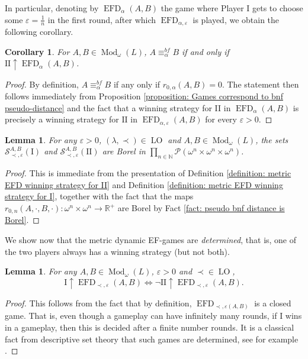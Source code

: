 \documentclass[12pt]{amsart}
\newtheorem{corollary}[theorem]{Corollary}
\newtheorem{lemma}[theorem]{Lemma}
\DeclareMathOperator{\EFD}{EFD}
\DeclareMathOperator{\Mod}{Mod}
\DeclareMathOperator{\LO}{LO}
\begin{document}
In particular, denoting by $\EFD_\alpha(A,B)$ the game where Player I gets to choose some $\varepsilon=\frac{1}{n}$ in the first round, after which $\EFD_{\alpha,\varepsilon}$ is played, we obtain the following corollary.

\begin{corollary}
    For $A,B\in\Mod_\omega(L)$, $A\equiv_\alpha^{bf} B$ if and only if $\mathrm{II}\uparrow \EFD_\alpha(A,B)$.
\end{corollary}
\begin{proof}
    By definition, $A\equiv_\alpha^{bf} B$ if any only if $r_{0,\alpha}(A,B)=0$. The statement then follows immediately from Proposition \ref{proposition: Games correspond to bnf pseudo-distance} and the fact that a winning strategy for II in $\EFD_\alpha(A,B)$ is precisely a winning strategy for $\mathrm{II}$ in $\EFD_{\alpha,\varepsilon}(A,B)$ for every $\varepsilon>0$.
\end{proof}

\begin{lemma}\label{lemma: set of winning strategies is Borel}
    For any $\varepsilon>0$, $(\lambda,\prec)\in\LO$ and $A,B\in\Mod_\omega(L)$, the sets $\mathcal{S}_{\prec,\varepsilon}^{A,B}(\mathrm{I})$ and $\mathcal{S}_{\prec,\varepsilon}^{A,B}(\mathrm{II})$ are Borel in $\prod_{n\in\mathbb N}\mathcal{P}(\omega^n\times\omega^n\times\omega^n)$.
\end{lemma}
\begin{proof}
    This is immediate from the presentation of Definition \ref{definition: metric EFD winning strategy for II} and Definition \ref{definition: metric EFD winning strategy for I}, together with the fact that the maps $r_{0,n}(A,\cdot,B,\cdot) \colon \omega^n\times\omega^n\to\mathbb R^+$ are Borel by Fact \ref{fact: pseudo bnf distance is Borel}.
\end{proof}

We show now that the metric dynamic EF-games are \textit{determined}, that is, one of the two players always has a winning strategy (but not both).

\begin{lemma}\label{lem: determinacy of metric EFD}
    For any $A,B\in\Mod_\omega(L)$, $\varepsilon>0$ and $\prec\in\LO$,
    \[ \mathrm{I} \uparrow\EFD_{\prec,\varepsilon}(A,B)\iff \neg \mathrm{II} \uparrow\EFD_{\prec,\varepsilon}(A,B).\]
\end{lemma}
\begin{proof}
    This follows from the fact that by definition, $\EFD_{\prec,\varepsilon(A,B)}$ is a {closed} game. That is, even though a gameplay can have infinitely many rounds, if I wins in a gameplay, then this is decided after a finite number rounds. It is a classical fact from descriptive set theory that such games are determined, see for example \cite[Chapter II.20]{MR1321597}.
\end{proof}
\end{document}
